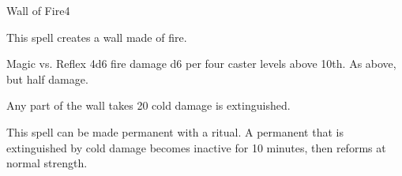 \begin{spellsection}{Wall of Fire}{4}
\begin{spellheader}
\end{spellheader}
\begin{spellcontent}
    \begin{spelltargetinginfo}
    \end{spelltargetinginfo}
    \begin{spelleffects}
        \spelleffect This spell creates a wall made of fire.
        \spelldur \durshort
    \end{spelleffects}
\end{spellcontent}
\begin{spellsubcontent}
    \begin{spelltargetinginfo}
    \end{spelltargetinginfo}
    \begin{spelleffects}
        \begin{spellattack}{Magic vs. Reflex}
            \spellsuccess 4d6 fire damage \add d6 per four caster levels above 10th.
            \spellfailure As above, but half damage.
        \end{spellattack}
    \end{spelleffects}
\end{spellsubcontent}
\begin{spellfooter}
    \spellnotes Any part of the wall takes 20 cold damage is extinguished.

    This spell can be made permanent with a  ritual. A permanent  that is extinguished by cold damage becomes inactive for 10 minutes, then reforms at normal strength.
\end{spellfooter}
\end{spellsection}

